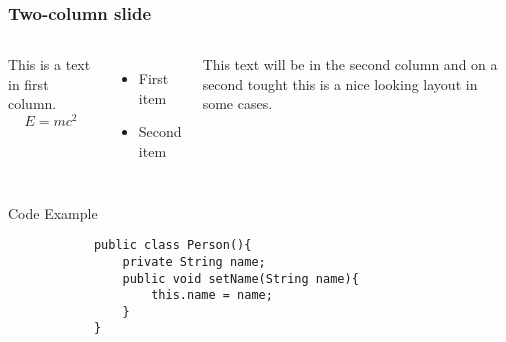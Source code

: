     
    \begin{frame}
    \frametitle{Two-column slide}
    
    \begin{columns}
    
    This is a text in first column.
    $$E=mc^2$$
    \begin{itemize}
    \item First item
    \item Second item
    \end{itemize}
    
    This text will be in the second column
    and on a second tought this is a nice looking
    layout in some cases.
    \end{columns}
    \end{frame}

    \begin{frame}[fragile]{Code Example}
        \begin{verbatim}
            public class Person(){
                private String name;
                public void setName(String name){
                    this.name = name;
                }
            }
        \end{verbatim}
    \end{frame}